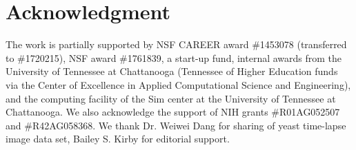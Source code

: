 \documentclass[conference]{IEEEtran}
\begin{document}


\section*{Acknowledgment}

The work is partially supported by NSF CAREER award \#1453078 (transferred to \#1720215), NSF award \#1761839, a  start-up fund, internal awards from the University of Tennessee at Chattanooga (Tennessee of Higher Education funds via the Center of Excellence in Applied Computational Science and Engineering), and the computing facility of the Sim center at the University of Tennessee at Chattanooga. We also acknowledge the support of NIH grants \#R01AG052507 and \#R42AG058368. We thank Dr. Weiwei Dang for sharing of yeast time-lapse image data set, Bailey S. Kirby for editorial support.
\end{document}
